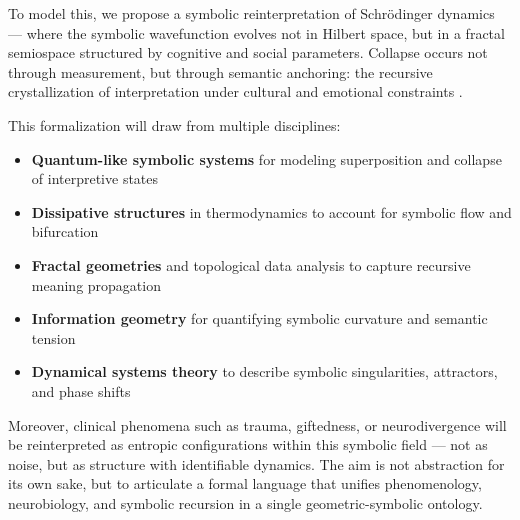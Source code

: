 To model this, we propose a symbolic reinterpretation of Schrödinger dynamics — where the symbolic wavefunction evolves not in Hilbert space, but in a fractal semiospace structured by cognitive and social parameters. Collapse occurs not through measurement, but through semantic anchoring: the recursive crystallization of interpretation under cultural and emotional constraints \cite{chang2015quantum, prigogine1980frombeing}.

This formalization will draw from multiple disciplines:
\begin{itemize}
  \item \textbf{Quantum-like symbolic systems} \cite{busemeyer2012quantum} for modeling superposition and collapse of interpretive states
  \item \textbf{Dissipative structures} in thermodynamics to account for symbolic flow and bifurcation
  \item \textbf{Fractal geometries} and topological data analysis to capture recursive meaning propagation
  \item \textbf{Information geometry} for quantifying symbolic curvature and semantic tension
  \item \textbf{Dynamical systems theory} to describe symbolic singularities, attractors, and phase shifts
\end{itemize}

Moreover, clinical phenomena such as trauma, giftedness, or neurodivergence will be reinterpreted as entropic configurations within this symbolic field — not as noise, but as structure with identifiable dynamics. The aim is not abstraction for its own sake, but to articulate a formal language that unifies phenomenology, neurobiology, and symbolic recursion in a single geometric-symbolic ontology.
